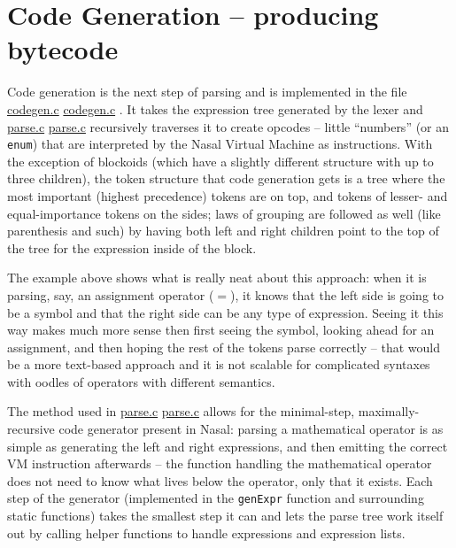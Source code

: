 \documentclass{article}
\newcommand{\type}[1]{\textcolor{type}{\tt #1}}
\newcommand{\func}[1]{\textcolor{func}{\tt #1}}
\newcommand{\nasalsourcefile}[2][]{%
  \ifthenelse{\isempty{#1}}%
    {%
      \textcolor{source}{%
        \href{https://github.com/andyross/nasal/blob/master/src/#2}{#2}%
      }%
    }%
    {%
      \textcolor{source}{%
        \href{https://github.com/andyross/nasal/blob/master/src/#2\#L#1}{#2}%
      }%
    }%
}
\newcommand{\nasalapi}[1]{\func{#1}}
\newcommand{\br}{\penalty3}
\begin{document}
{%
}

\section{Code Generation -- producing bytecode}

Code generation is the next step of parsing and is implemented in the file \nasalsourcefile{codegen.c}.  It takes the expression tree generated by the lexer and \nasalsourcefile{parse.c} recursively traverses it to create opcodes -- little ``numbers'' (or an  \type{enum}) that are interpreted by the Nasal Virtual Machine as instructions.  With the exception of blockoids (which have a slightly different structure with up to three children), the token structure that code generation gets is a tree where the most important (highest precedence) tokens are on top, and tokens of lesser- and equal-importance tokens on the sides; laws of grouping are followed as well (like parenthesis and such) by having both left and right children point to the top of the tree for the expression inside of the block.

The example above shows what is really neat about this approach: when it is parsing, say, an assignment operator ($=$), it knows that the left side is going to be a symbol and that the right side can be any type of expression.  Seeing it this way makes much more sense then first seeing the symbol, looking ahead for an assignment, and then hoping the rest of the tokens parse correctly -- that would be a more text-based approach and it is not scalable for complicated syntaxes with oodles of operators with different semantics.

The method used in \nasalsourcefile{parse.c} allows for the minimal-step, maximally-recursive code generator present in Nasal: parsing a mathematical operator is as simple as generating the left and right expressions, and then emitting the correct VM instruction afterwards -- the function handling the mathematical operator does not need to know what lives below the operator, only that it exists.  Each step of the generator (implemented in the \nasalapi{gen\br Expr} function and surrounding static functions) takes the smallest step it can and lets the parse tree work itself out by calling helper functions to handle expressions and expression lists.
\end{document}
